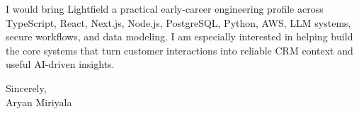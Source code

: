 \documentclass[letterpaper,11pt]{article}
\begin{document}
I would bring Lightfield a practical early-career engineering profile across TypeScript, React, Next.js, Node.js, PostgreSQL, Python, AWS, LLM systems, secure workflows, and data modeling. I am especially interested in helping build the core systems that turn customer interactions into reliable CRM context and useful AI-driven insights.

Sincerely,\\
Aryan Miriyala
\end{document}
